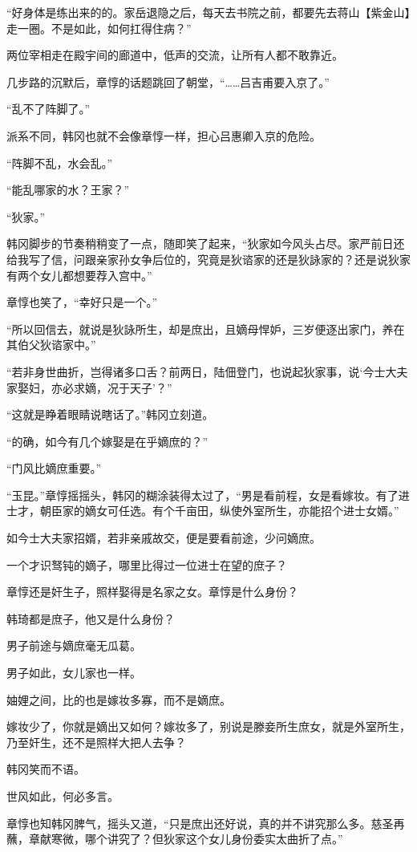 “好身体是练出来的的。家岳退隐之后，每天去书院之前，都要先去蒋山【紫金山】走一圈。不是如此，如何扛得住病？”

两位宰相走在殿宇间的廊道中，低声的交流，让所有人都不敢靠近。

几步路的沉默后，章惇的话题跳回了朝堂，“……吕吉甫要入京了。”

“乱不了阵脚了。”

派系不同，韩冈也就不会像章惇一样，担心吕惠卿入京的危险。

“阵脚不乱，水会乱。”

“能乱哪家的水？王家？”

“狄家。”

韩冈脚步的节奏稍稍变了一点，随即笑了起来，“狄家如今风头占尽。家严前日还给我写了信，问跟亲家孙女争后位的，究竟是狄谘家的还是狄詠家的？还是说狄家有两个女儿都想要荐入宫中。”

章惇也笑了，“幸好只是一个。”

“所以回信去，就说是狄詠所生，却是庶出，且嫡母悍妒，三岁便逐出家门，养在其伯父狄谘家中。”

“若非身世曲折，岂得诸多口舌？前两日，陆佃登门，也说起狄家事，说‘今士大夫家娶妇，亦必求嫡，况于天子’？”

“这就是睁着眼睛说瞎话了。”韩冈立刻道。

“的确，如今有几个嫁娶是在乎嫡庶的？”

“门风比嫡庶重要。”

“玉昆。”章惇摇摇头，韩冈的糊涂装得太过了，“男是看前程，女是看嫁妆。有了进士才，朝臣家的嫡女可任选。有个千亩田，纵使外室所生，亦能招个进士女婿。”

如今士大夫家招婿，若非亲戚故交，便是要看前途，少问嫡庶。

一个才识驽钝的嫡子，哪里比得过一位进士在望的庶子？

章惇还是奸生子，照样娶得是名家之女。章惇是什么身份？

韩琦都是庶子，他又是什么身份？

男子前途与嫡庶毫无瓜葛。

男子如此，女儿家也一样。

妯娌之间，比的也是嫁妆多寡，而不是嫡庶。

嫁妆少了，你就是嫡出又如何？嫁妆多了，别说是滕妾所生庶女，就是外室所生，乃至奸生，还不是照样大把人去争？

韩冈笑而不语。

世风如此，何必多言。

章惇也知韩冈脾气，摇头又道，“只是庶出还好说，真的并不讲究那么多。慈圣再蘸，章献寒微，哪个讲究了？但狄家这个女儿身份委实太曲折了点。”

